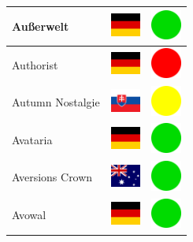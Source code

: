 \documentclass[12pt, a4paper, twoside]{report}
\begin{document}
\begin{center}
\begin{longtable}{|p{5cm}|p{2cm}|p{2cm}|}
 Außerwelt                                                  & \includegraphics[width=1cm]{../4x3/de} &   \includegraphics[width=1cm]{../likes/y} \\ \hline
 Authorist                                                  & \includegraphics[width=1cm]{../4x3/de} &   \includegraphics[width=1cm]{../likes/n} \\ \hline
 Autumn Nostalgie                                           & \includegraphics[width=1cm]{../4x3/sk} &   \includegraphics[width=1cm]{../likes/m} \\ \hline
 Avataria                                                   & \includegraphics[width=1cm]{../4x3/de} &   \includegraphics[width=1cm]{../likes/y} \\ \hline
 Aversions Crown                                            & \includegraphics[width=1cm]{../4x3/au} &   \includegraphics[width=1cm]{../likes/y} \\ \hline
 Avowal                                                     & \includegraphics[width=1cm]{../4x3/de} &   \includegraphics[width=1cm]{../likes/y} \\ \hline

\end{longtable}
\end{center}
\end{document}
